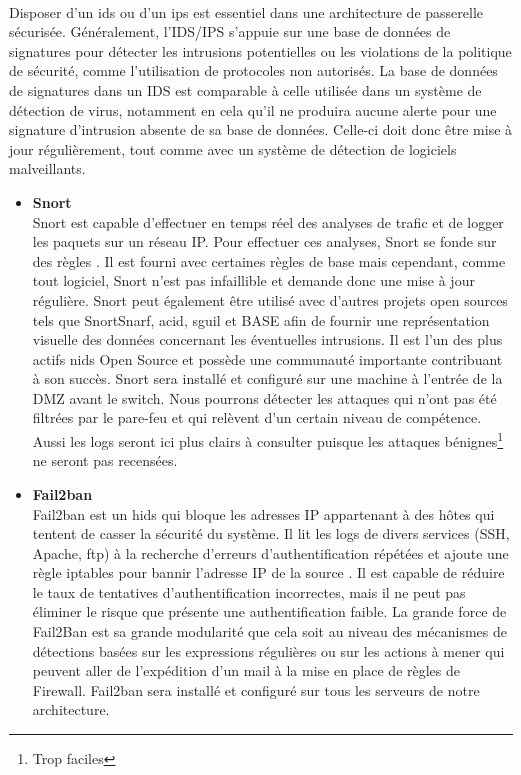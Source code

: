 	    \paragraph{}
	      Disposer d’un \gls{ids} ou d’un \gls{ips} est essentiel dans une architecture de passerelle sécurisée. Généralement, l’IDS/IPS s’appuie sur une base de données de signatures pour détecter les intrusions potentielles ou les violations de la politique de sécurité, comme l'utilisation de protocoles non autorisés. La base de données de signatures dans un IDS est comparable à celle utilisée dans un système de détection de virus, notamment en cela qu’il ne produira aucune alerte pour une signature d’intrusion absente de sa base de données. Celle-ci doit donc être mise à jour régulièrement, tout comme avec un système de détection de logiciels malveillants.
		\begin{itemize}
		  \item \textbf{Snort}\\
		  Snort est capable d'effectuer en temps réel des analyses de trafic et de logger les paquets sur un réseau IP. Pour effectuer ces analyses, Snort se fonde sur des règles \cite{d}. Il est fourni avec certaines règles de base mais cependant, comme tout logiciel, Snort n'est pas infaillible et demande donc une mise à jour régulière. Snort peut également être utilisé avec d'autres projets open sources tels que SnortSnarf, \gls{acid}, sguil et BASE afin de fournir une représentation visuelle des données concernant les éventuelles intrusions. Il est l'un des plus actifs \gls{nids} Open Source et possède une communauté importante contribuant à son succès. Snort sera install\'e et configur\'e sur une machine \`a l'entr\'ee de la DMZ avant le switch. Nous pourrons détecter les attaques qui n'ont pas été filtrées par le pare-feu et qui relèvent d'un certain niveau de compétence. Aussi les logs seront ici plus clairs à consulter puisque les attaques bénignes\footnote{Trop faciles} ne seront pas recensées.

		  \item \textbf{Fail2ban}\\
		  Fail2ban est un \gls{hids} qui bloque les adresses IP appartenant à des hôtes qui tentent de casser la sécurité du système. Il lit les logs de divers services (SSH, Apache, \gls{ftp}) à la recherche d'erreurs d'authentification répétées et ajoute une règle iptables pour bannir l'adresse IP de la source \cite{i}. Il est capable de réduire le taux de tentatives d'authentification incorrectes, mais il ne peut pas éliminer le risque que présente une authentification faible.  La grande force de Fail2Ban est sa grande modularité que cela soit au niveau des mécanismes de détections basées sur les expressions régulières ou sur les actions à mener qui peuvent aller de l'expédition d'un mail à la mise en place de règles de Firewall. Fail2ban sera install\'e et configur\'e sur tous les serveurs de notre architecture.
		\end{itemize}
		
